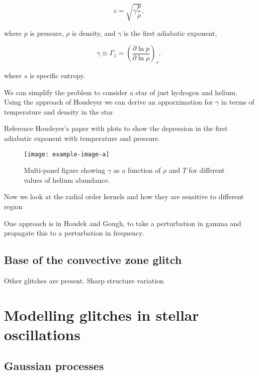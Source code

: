 \begin{equation}
    c = \sqrt{\gamma \frac{p}{\rho}},
\end{equation}

where \(p\) is pressure, \(\rho\) is density, and \(\gamma\) is the first adiabatic exponent,

\begin{equation}
    \gamma \equiv \Gamma_1 = \left( \frac{\partial \ln p}{\partial \ln \rho} \right)_s,
\end{equation}

where \(s\) is specific entropy.

We can simplify the problem to consider a star of just hydrogen and helium. Using the approach of Houdeyer we can derive an apporximation for \(\gamma\) in terms of temperature and density in the star

Reference Houdeyer's paper with plots to show the depression in the first adiabatic exponent with temperature and pressure. 

\begin{figure}
    \centering
    \texttt{[image: example-image-a]}
    \caption{Multi-panel figure showing \(\gamma\) as a function of \(\rho\) and \(T\) for different values of helium abundance.}
    \label{fig:gamma-temp-density}
\end{figure}

Now we look at the radial order kernels and how they are sensitive to different region


One approach is in Houdek and Gough, to take a perturbation in gamma and propagate this to a perturbation in frequency.

\subsection{Base of the convective zone glitch}\label{sec:bcz-glitch}

Other glitches are present. Sharp structure variation

\section{Modelling glitches in stellar oscillations}


\subsection{Gaussian processes }\label{sec:glitch-gp}

